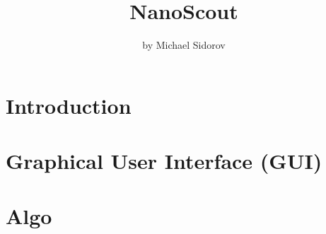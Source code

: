 \documentclass[12pt]{report}
\title{NanoScout}
\begin{document}
\author{by Michael Sidorov}


\maketitle

\setcounter{page}{2}
\tableofcontents
\clearpage

\setcounter{page}{3}

\chapter{Introduction}


\chapter{Graphical User Interface (GUI)}


\chapter{Algo}


\printbibliography
\end{document}
